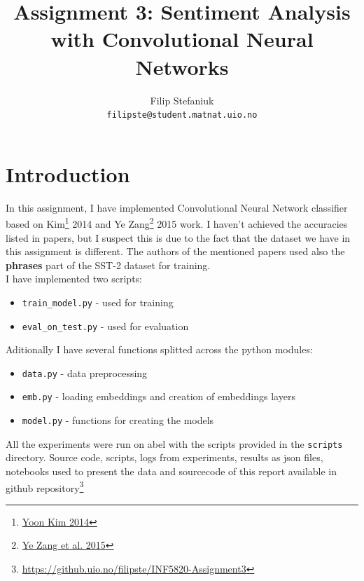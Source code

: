 \documentclass{article}
\title{Assignment 3: Sentiment Analysis with Convolutional Neural Networks} %
\author{Filip Stefaniuk\\ \texttt{filipste@student.matnat.uio.no}} %
\begin{document}
\maketitle
\section*{Introduction}
In this assignment, I have implemented Convolutional Neural Network classifier
based on Kim\footnote{\href{https://arxiv.org/abs/1408.5882}{Yoon Kim 2014}} 2014 and 
Ye Zang\footnote{\href{https://arxiv.org/abs/1510.03820}{Ye Zang et al. 2015}} 2015
work. I haven't achieved the accuracies listed in papers, but I suspect this is due to the
fact that the dataset we have in this assignment is different. The authors of the mentioned
papers used also the \textbf{phrases} part of the SST-2 dataset for training.\\
I have implemented two scripts:
\begin{itemize}
    \item \lstinline{train_model.py} - used for training
    \item \lstinline{eval_on_test.py} - used for evaluation
\end{itemize}
Aditionally I have several functions splitted across the python modules:
\begin{itemize}
    \item \lstinline{data.py} - data preprocessing
    \item \lstinline{emb.py} - loading embeddings and creation of embeddings layers
    \item \lstinline{model.py} - functions for creating the models
\end{itemize}
All the experiments were run on abel with the scripts provided in the \lstinline{scripts}
directory. Source code, scripts, logs from experiments, results as json files,
notebooks used to present the data and sourcecode of this report 
available in github repository\footnote{\href{https://github.uio.no/filipste/INF5820-Assignment3}{https://github.uio.no/filipste/INF5820-Assignment3}}
\end{document}
